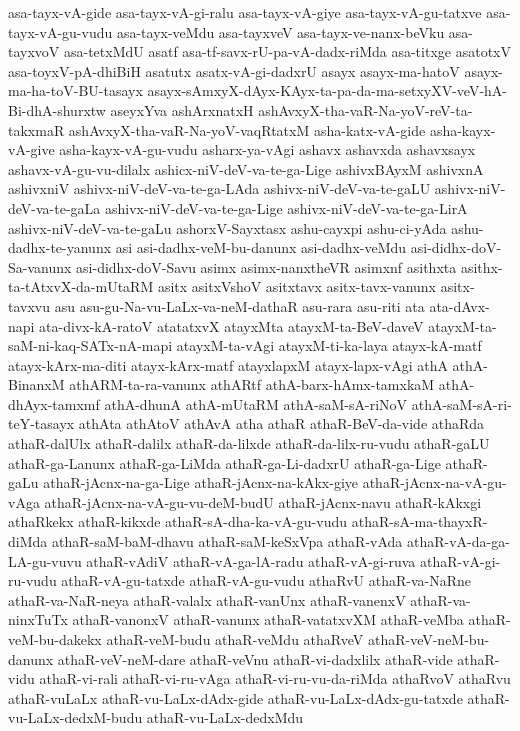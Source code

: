 {asa-tayx-vA-gide
asa-tayx-vA-gi-ralu
asa-tayx-vA-giye
asa-tayx-vA-gu-tatxve
asa-tayx-vA-gu-vudu
asa-tayx-veMdu
asa-tayxveV
asa-tayx-ve-nanx-beVku
asa-tayxvoV
asa-tetxMdU
asatf
asa-tf-savx-rU-pa-vA-dadx-riMda
asa-titxge
asatotxV
asa-toyxV-pA-dhiBiH
asatutx
asatx-vA-gi-dadxrU
asayx
asayx-ma-hatoV
asayx-ma-ha-toV-BU-tasayx
asayx-sAmxyX-dAyx-KAyx-ta-pa-da-ma-setxyXV-veV-hA-Bi-dhA-shurxtw
aseyxYva
ashArxnatxH
ashAvxyX-tha-vaR-Na-yoV-reV-ta-takxmaR
ashAvxyX-tha-vaR-Na-yoV-vaqRtatxM
asha-katx-vA-gide
asha-kayx-vA-give
asha-kayx-vA-gu-vudu
asharx-ya-vAgi
ashavx
ashavxda
ashavxsayx
ashavx-vA-gu-vu-dilalx
ashicx-niV-deV-va-te-ga-Lige
ashivxBAyxM
ashivxnA
ashivxniV
ashivx-niV-deV-va-te-ga-LAda
ashivx-niV-deV-va-te-gaLU
ashivx-niV-deV-va-te-gaLa
ashivx-niV-deV-va-te-ga-Lige
ashivx-niV-deV-va-te-ga-LirA
ashivx-niV-deV-va-te-gaLu
ashorxV-Sayxtasx
ashu-cayxpi
ashu-ci-yAda
ashu-dadhx-te-yanunx
asi
asi-dadhx-veM-bu-danunx
asi-dadhx-veMdu
asi-didhx-doV-Sa-vanunx
asi-didhx-doV-Savu
asimx
asimx-nanxtheVR
asimxnf
asithxta
asithx-ta-tAtxvX-da-mUtaRM
asitx
asitxVshoV
asitxtavx
asitx-tavx-vanunx
asitx-tavxvu
asu
asu-gu-Na-vu-LaLx-va-neM-dathaR
asu-rara
asu-riti
ata
ata-dAvx-napi
ata-divx-kA-ratoV
atatatxvX
atayxMta
atayxM-ta-BeV-daveV
atayxM-ta-saM-ni-kaq-SATx-nA-mapi
atayxM-ta-vAgi
atayxM-ti-ka-laya
atayx-kA-matf
atayx-kArx-ma-diti
atayx-kArx-matf
atayxlapxM
atayx-lapx-vAgi
athA
athA-BinanxM
athARM-ta-ra-vanunx
athARtf
athA-barx-hAmx-tamxkaM
athA-dhAyx-tamxmf
athA-dhunA
athA-mUtaRM
athA-saM-sA-riNoV
athA-saM-sA-ri-teY-tasayx
athAta
athAtoV
athAvA
atha
athaR
athaR-BeV-da-vide
athaRda
athaR-dalUlx
athaR-dalilx
athaR-da-lilxde
athaR-da-lilx-ru-vudu
athaR-gaLU
athaR-ga-Lanunx
athaR-ga-LiMda
athaR-ga-Li-dadxrU
athaR-ga-Lige
athaR-gaLu
athaR-jAcnx-na-ga-Lige
athaR-jAcnx-na-kAkx-giye
athaR-jAcnx-na-vA-gu-vAga
athaR-jAcnx-na-vA-gu-vu-deM-budU
athaR-jAcnx-navu
athaR-kAkxgi
athaRkekx
athaR-kikxde
athaR-sA-dha-ka-vA-gu-vudu
athaR-sA-ma-thayxR-diMda
athaR-saM-baM-dhavu
athaR-saM-keSxVpa
athaR-vAda
athaR-vA-da-ga-LA-gu-vuvu
athaR-vAdiV
athaR-vA-ga-lA-radu
athaR-vA-gi-ruva
athaR-vA-gi-ru-vudu
athaR-vA-gu-tatxde
athaR-vA-gu-vudu
athaRvU
athaR-va-NaRne
athaR-va-NaR-neya
athaR-valalx
athaR-vanUnx
athaR-vanenxV
athaR-va-ninxTuTx
athaR-vanonxV
athaR-vanunx
athaR-vatatxvXM
athaR-veMba
athaR-veM-bu-dakekx
athaR-veM-budu
athaR-veMdu
athaRveV
athaR-veV-neM-bu-danunx
athaR-veV-neM-dare
athaR-veVnu
athaR-vi-dadxlilx
athaR-vide
athaR-vidu
athaR-vi-rali
athaR-vi-ru-vAga
athaR-vi-ru-vu-da-riMda
athaRvoV
athaRvu
athaR-vuLaLx
athaR-vu-LaLx-dAdx-gide
athaR-vu-LaLx-dAdx-gu-tatxde
athaR-vu-LaLx-dedxM-budu
athaR-vu-LaLx-dedxMdu
}
